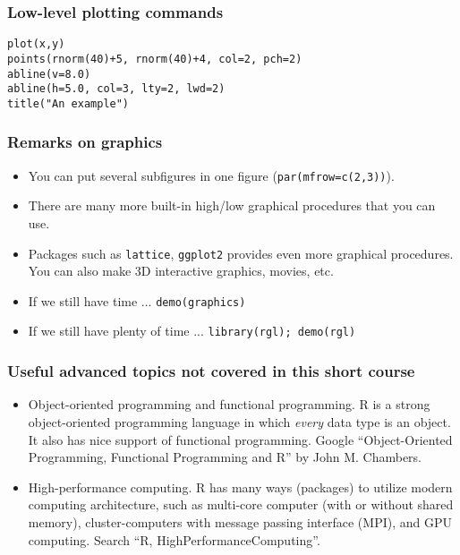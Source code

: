\begin{frame}
  \frametitle{Low-level plotting commands}
\begin{verbatim}
plot(x,y)
points(rnorm(40)+5, rnorm(40)+4, col=2, pch=2)
abline(v=8.0)
abline(h=5.0, col=3, lty=2, lwd=2)
title("An example")

\end{verbatim}
\end{frame}

\begin{frame}
  \frametitle{Remarks on graphics}
  \begin{itemize}
  \item You can put several subfigures in one figure (\texttt{par(mfrow=c(2,3))}).
  \item There are many more built-in high/low graphical procedures
    that you can use.
  \item Packages such as \texttt{lattice}, \texttt{ggplot2} provides
    even more graphical procedures. You can also make 3D interactive
    graphics, movies, etc.
  \item If we still have time ... \texttt{demo(graphics)}
  \item If we still have plenty of time ... \texttt{library(rgl); demo(rgl)}
  \end{itemize}
\end{frame}

\begin{frame}
  \frametitle{Useful advanced topics not covered in this short course}
  \begin{itemize}
  \item Object-oriented programming and functional programming. R is a
    strong object-oriented programming language in which \emph{every}
    data type is an object.  It also has nice support of functional
    programming. Google ``Object-Oriented Programming, Functional
    Programming and R'' by John M. Chambers.
  \item High-performance computing. R has many ways (packages) to
    utilize modern computing architecture, such as multi-core computer
    (with or without shared memory), cluster-computers with message
    passing interface (MPI), and GPU computing.  Search ``R,
    HighPerformanceComputing''.
  \end{itemize}
\end{frame}

